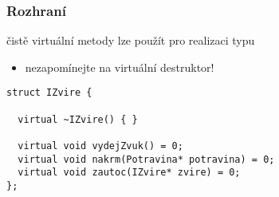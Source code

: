 \begin{frame}[fragile]
\frametitle{Rozhraní}

\begin{bitemize}
\item čistě virtuální metody lze použít pro realizaci typu 
\begin{itemize}
\item nezapomínejte na virtuální destruktor!
\end{itemize}
\end{bitemize}


\begin{yesblock}
\begin{lstlisting}
struct IZvire {

  virtual ~IZvire() { }

  virtual void vydejZvuk() = 0;
  virtual void nakrm(Potravina* potravina) = 0;
  virtual void zautoc(IZvire* zvire) = 0;
};
\end{lstlisting}
\end{yesblock}
\end{frame}











